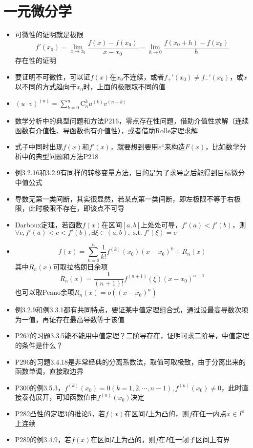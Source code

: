\documentclass[UTF8]{ctexart}
\DeclareMathOperator{\st}{s.t.}
\begin{document}
\section{一元微分学}
\begin{itemize}
\item 可微性的证明就是极限
\[
f'(x_0) = \lim_{x\to x_0} \frac{f(x)-f(x_0)}{x-x_0} = \lim_{h\to 0} \frac{f(x_0+h)-f(x_0)}{h}
\]
存在性的证明

\item 要证明不可微性，可以证$f(x)$在$x_0$不连续，或者$f_+'(x_0)\neq f_-'(x_0)$，或$x$以不同的方式趋向于$x_0$时，上面的极限取不同的值

\item $(u\cdot v)^{(n)} = \sum_{k=0}^n \text{C}_n^k u^{(k)}v^{(n-k)}$

\item 数学分析中的典型问题和方法P216，零点存在性问题，借助介值性求解（连续函数有介值性、导函数也有介值性），或者借助Rolle定理求解

\item 式子中同时出现$f(x)$和$f'(x)$，就要想到要用$e^x$来构造$F(x)$，比如数学分析中的典型问题和方法P218

\item 例3.2.16和3.2.9有同样的转移变量方法，目的是为了求导之后能得到目标微分中值公式

\item 导数无第一类间断，其实很显然，若某点第一类间断，即左极限不等于右极限，此时极限不存在，即该点不可导

\item Darboux定理，若函数$f(x)$在区间$[a,b]$上处处可导，$f'(a)<f'(b)$，则$\forall c,f'(a)<c<f'(b),\exists \xi \in (a,b),\st f'(\xi)=c$

\item
\[
f(x) = \sum_{k=0}^n \frac{1}{k!}f^{(k)}(x_0)(x-x_0)^k + R_n(x)
\]
其中$R_n(x)$可取拉格朗日余项
\[
R_n(x) = \frac{1}{(n+1)!}f^{(n+1)}(\xi)(x-x_0)^{n+1}
\]
也可以取Peano余项$R_n(x)=o((x-x_0)^n)$

\item 例3.2.9和例3.3.1都有共同特点，要证某中值定理组合式，通过设最高导数次项为一值，再证存在最高导数等于该值

\item P267的习题3.3.5能不能用中值定理？二阶导存在，证明可求二阶导，中值定理的条件是什么？

\item P296的习题3.4.18是非常经典的分离系数法，取值可取极致，由于分离出来的函数单调，直接取边界

\item P300的例3.5.3，$f^{(k)}(x_0)=0(k=1,2,\cdots,n-1),f^{(n)}(x_0)\neq0$，此时直接泰勒展开，可知函数值由$f^{(n)}(x_0)$决定

\item P282凸性的定理3的推论5，若$f(x)$在区间$I$上为凸的，则$f$在任一内点$x\in I^o$上连续

\item P289的例3.4.9，若$f(x)$在区间$I$上为凸的，则$f$在$I$任一闭子区间上有界

\end{itemize}
\end{document}
